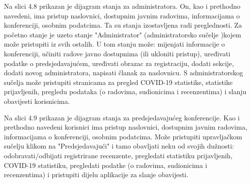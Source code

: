			Na slici 4.8 prikazan je dijagram stanja za administratora. On, kao i prethodno navedeni, ima pristup naslovnici, dostupnim javnim radovima, informacijama o konferenciji, osobnim podatcima. Ta su stanja izostavljena radi preglednosti. Za početno stanje je uzeto stanje "Administrator" (administratorsko sučelje )kojem može pristupiti iz svih ostalih. U tom stanju može: mijenjati informacije o konferenciji, učiniti radove javno dostupnima (ili ukloniti pristup), uređivati podatke o predsjedavajućem, uređivati obrazac za registraciju, dodati sekcije, dodati novog administratora, napisati članak za naslovnicu. S administratorskog sučelja može pristupiti stranicama za pregled COVID-19 statistike, statistike prijavljenih, pregledu podataka (o radovima, sudionicima i recenzentima) i slanju obavijesti korisnicima.
			
			Na slici 4.9 prikazan je dijagram stanja za predsjedavajućeg konferencije. Kao i prethodno navedeni korisnici ima pristup naslovnici, dostupnim javnim radovima, informacijama o konferenciji, osobnim podatcima. Može pristupiti upravljačkom sučelju klikom na "Predsjedavajući" i tamo obavljati neku od svojih dužnosti: odobravati/odbijati registrirane recenzente, pregledati statistiku prijavljenih, COVID-19 statistiku, pregledati podatke (o radovima, sudionicima i recenzentima) i pristupiti dijelu aplikacije za slanje obavijesti.
			

